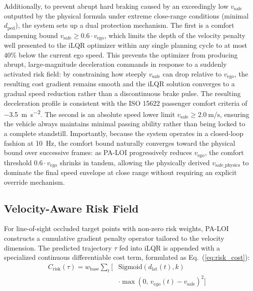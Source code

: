 \documentclass[conference]{IEEEtran}
\begin{document}
Additionally, to prevent abrupt hard braking caused by an exceedingly low $v_{\text{safe}}$ outputted by the physical formula under extreme close-range conditions (minimal $d_{\text{ped}}$), the system sets up a dual protection mechanism. The first is a comfort dampening bound $v_{\text{safe}} \geq 0.6 \cdot v_{\text{ego}}$, which limits the depth of the velocity penalty well presented to the iLQR optimizer within any single planning cycle to at most $40\%$ below the current ego speed. This prevents the optimizer from producing abrupt, large-magnitude deceleration commands in response to a suddenly activated risk field: by constraining how steeply $v_{\text{safe}}$ can drop relative to $v_{\text{ego}}$, the resulting cost gradient remains smooth and the iLQR solution converges to a gradual speed reduction rather than a discontinuous brake pulse. The resulting deceleration profile is consistent with the ISO 15622 passenger comfort criteria of \SI{-3.5}{\meter\per\second\squared}. The second is an absolute speed lower limit $v_{\text{safe}} \geq \SI{2.0}{\meter\per\second}$, ensuring the vehicle always maintains minimal passing ability rather than being locked to a complete standstill. Importantly, because the system operates in a closed-loop fashion at \SI{10}{\hertz}, the comfort bound naturally converges toward the physical bound over successive frames: as PA-LOI progressively reduces $v_{\text{ego}}$, the comfort threshold $0.6 \cdot v_{\text{ego}}$ shrinks in tandem, allowing the physically derived $v_{\text{safe\_physics}}$ to dominate the final speed envelope at close range without requiring an explicit override mechanism.

\subsection{Velocity-Aware Risk Field}
For line-of-sight occluded target points with non-zero risk weights, PA-LOI constructs a cumulative gradient penalty operator tailored to the velocity dimension. The predicted trajectory $\tau$ fed into iLQR is appended with a specialized continuous differentiable cost term, formulated as Eq.~(\ref{eq:risk_cost}):
\begin{equation}
\begin{split}
    C_{\text{risk}}(\tau) = w_{\text{base}} \sum_{t} \Big[ &\text{Sigmoid}(d_{\text{lat}}(t), k) \\
    &\cdot \max(0,\, v_{\text{ego}}(t) - v_{\text{safe}})^2 \Big]
\end{split}
    \label{eq:risk_cost}
\end{equation}
\end{document}
